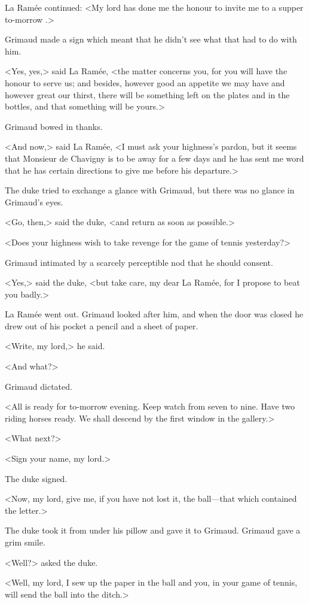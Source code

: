 La Ramée continued: <My lord has done me the honour to invite me to a supper to-morrow .>

Grimaud made a sign which meant that he didn't see what that had to do with him.

<Yes, yes,> said La Ramée, <the matter concerns you, for you will have the honour to serve us; and besides, however good an appetite we may have and however great our thirst, there will be something left on the plates and in the bottles, and that something will be yours.>

Grimaud bowed in thanks.

<And now,> said La Ramée, <I must ask your highness's pardon, but it seems that Monsieur de Chavigny is to be away for a few days and he has sent me word that he has certain directions to give me before his departure.>

The duke tried to exchange a glance with Grimaud, but there was no glance in Grimaud's eyes.

<Go, then,> said the duke, <and return as soon as possible.>

<Does your highness wish to take revenge for the game of tennis yesterday?>

Grimaud intimated by a scarcely perceptible nod that he should consent.

<Yes,> said the duke, <but take care, my dear La Ramée, for I propose to beat you badly.>

La Ramée went out. Grimaud looked after him, and when the door was closed he drew out of his pocket a pencil and a sheet of paper.

<Write, my lord,> he said.

<And what?>

Grimaud dictated.

<All is ready for to-morrow evening. Keep watch from seven to nine. Have two riding horses ready. We shall descend by the first window in the gallery.>

<What next?>

<Sign your name, my lord.>

The duke signed.

<Now, my lord, give me, if you have not lost it, the ball—that which contained the letter.>

The duke took it from under his pillow and gave it to Grimaud. Grimaud gave a grim smile.

<Well?> asked the duke.

<Well, my lord, I sew up the paper in the ball and you, in your game of tennis, will send the ball into the ditch.>

